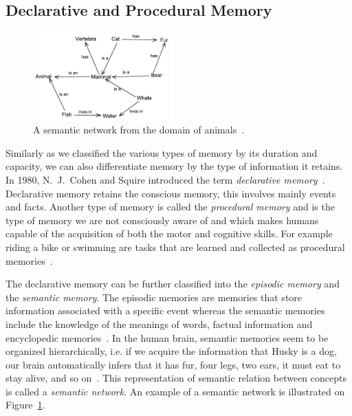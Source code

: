\subsection{Declarative and Procedural Memory}

\begin{figure}
  \centering
  \includegraphics[width=0.48\textwidth]{img/semantic-network}
  \caption{A semantic network from the domain of animals~\cite{semanticnetworkpict}.}
  \label{fig:semantic-network}
\end{figure}

Similarly as we classified the various types of memory by its duration and capacity, we can also differentiate memory by the type of information it retains. In 1980, N.~J.~Cohen and Squire introduced the term \textit{declarative memory}~\cite{cohen1980preserved}. Declarative memory retains the conscious memory, this involves mainly events and facts. Another type of memory is called the \textit{procedural memory} and is the type of memory we are not consciously aware of and which makes humans capable of the acquisition of both the motor and cognitive skills. For example riding a bike or swimming are tasks that are learned and collected as procedural memories~\cite{MichaelW.Eysenck2008}.

The declarative memory can be further classified into the \textit{episodic memory} and the \textit{semantic memory}. The episodic memories are memories that store information associated with a specific event whereas the semantic memories include the knowledge of the meanings of words, factual information and encyclopedic memories~\cite{cohen1980preserved}. In the human brain, semantic memories seem to be organized hierarchically, i.e. if we acquire the information that Husky is a dog, our brain automatically infers that it has fur, four legs, two ears, it must eat to stay alive, and so on~\cite{mcclelland1995there}. This representation of semantic relation between concepts is called a \textit{semantic network}. An example of a semantic network is illustrated on Figure~\ref{fig:semantic-network}.

